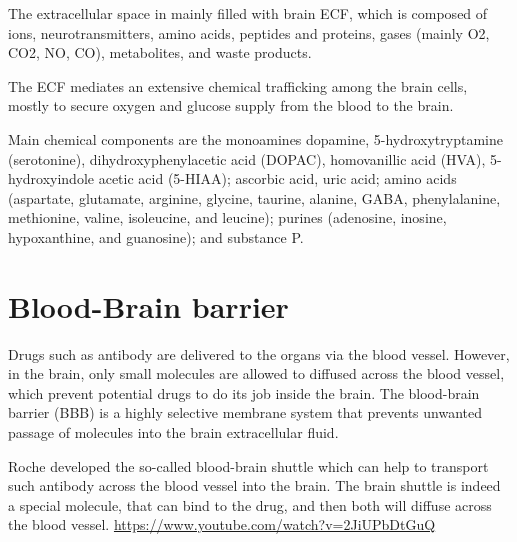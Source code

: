 The extracellular space in mainly filled with brain ECF, which is composed of
ions, neurotransmitters, amino acids, peptides and proteins, gases (mainly O2,
CO2, NO, CO), metabolites, and waste products.

The ECF mediates an extensive chemical trafficking among the brain cells, mostly
to secure oxygen and glucose supply from the blood to the brain.

Main chemical components are the monoamines dopamine, 5-hydroxytryptamine
(serotonine), dihydroxyphenylacetic acid (DOPAC), homovanillic acid (HVA),
5-hydroxyindole acetic acid (5-HIAA); ascorbic acid, uric acid; amino acids
(aspartate, glutamate, arginine, glycine, taurine, alanine, GABA, phenylalanine,
methionine, valine, isoleucine, and leucine); purines (adenosine, inosine,
hypoxanthine, and guanosine); and substance P.



\section{Blood-Brain barrier}


Drugs such as antibody are delivered to the organs via the blood vessel.
However, in the brain, only small molecules are allowed to diffused across the
blood vessel, which prevent potential drugs to do its job inside the brain.
The blood-brain barrier (BBB) is a highly selective membrane system that
prevents unwanted passage of molecules into the brain extracellular fluid.

Roche developed the so-called {blood-brain shuttle} which can help to
transport such antibody across the blood vessel into the brain.
The brain shuttle is indeed a special molecule, that can bind to the drug, and
then both will diffuse across the blood vessel.
\url{https://www.youtube.com/watch?v=2JiUPbDtGuQ}

